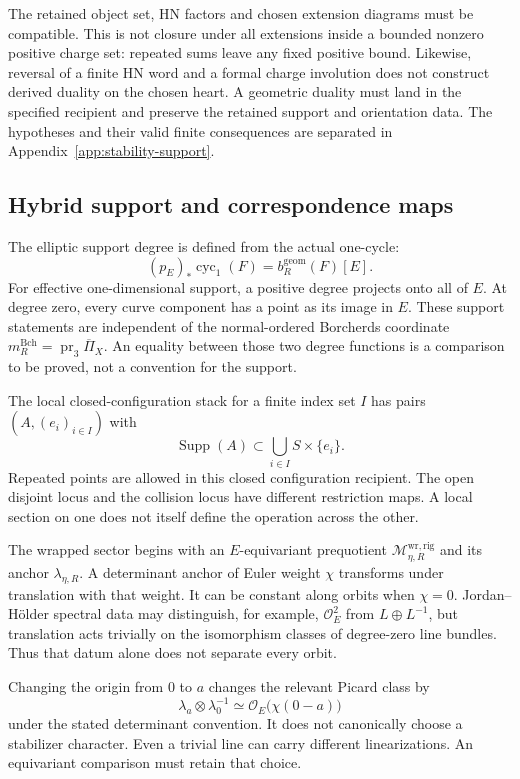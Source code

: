 The retained object set, HN factors and chosen extension diagrams
must be compatible. This is not closure under all extensions inside
a bounded nonzero positive charge set: repeated sums leave any
fixed positive bound. Likewise, reversal of a finite HN word and a
formal charge involution does not construct derived duality on the
chosen heart. A geometric duality must land in the specified
recipient and preserve the retained support and orientation data.
The hypotheses and their valid finite consequences are separated
in Appendix~\ref{app:stability-support}.

\subsection{Hybrid support and correspondence maps}
\label{app:build-hybrid-wrapped}

The elliptic support degree is defined from the actual one-cycle:
\[
 (p_E)_*\operatorname{cyc}_1(F)=b_R^{\mathrm{geom}}(F)[E].
\]
For effective one-dimensional support, a positive degree projects
onto all of \(E\). At degree zero, every curve component has a
point as its image in \(E\). These support statements are independent of the
normal-ordered Borcherds coordinate
\(m_R^{\mathrm{Bch}}=\operatorname{pr}_3\overline\Pi_X\).
An equality between those two degree functions is a comparison to
be proved, not a convention for the support.

The local closed-configuration stack for a finite index set \(I\)
has pairs \((A,(e_i)_{i\in I})\) with
\[
 \operatorname{Supp}(A)\subset
       \bigcup_{i\in I}S\times\{e_i\}.
\]
Repeated points are allowed in this closed configuration recipient.
The open disjoint locus and the collision locus have different
restriction maps. A local section on one does not itself define
the operation across the other.

The wrapped sector begins with an \(E\)-equivariant prequotient
\(\mathcal M_{\eta,R}^{\mathrm{wr,rig}}\) and its anchor
\(\lambda_{\eta,R}\). A determinant anchor of Euler weight
\(\chi\) transforms under translation with that weight. It can
be constant along orbits when \(\chi=0\). Jordan--H\"older
spectral data may distinguish, for example, \(\mathcal O_E^2\)
from \(L\oplus L^{-1}\), but translation acts trivially on the
isomorphism classes of degree-zero line bundles. Thus that datum
alone does not separate every orbit.

Changing the origin from \(0\) to \(a\) changes the relevant
Picard class by
\[
 \lambda_a\otimes\lambda_0^{-1}
       \simeq\mathcal O_E\bigl(\chi(0-a)\bigr)
\]
under the stated determinant convention. It does not canonically
choose a stabilizer character. Even a trivial line can carry
different linearizations. An equivariant comparison must retain
that choice.

